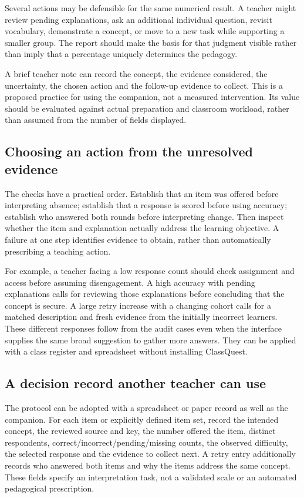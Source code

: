 Several actions may be defensible for the same numerical result. A teacher might review pending explanations, ask an additional individual question, revisit vocabulary, demonstrate a concept, or move to a new task while supporting a smaller group. The report should make the basis for that judgment visible rather than imply that a percentage uniquely determines the pedagogy.

A brief teacher note can record the concept, the evidence considered, the uncertainty, the chosen action and the follow-up evidence to collect. This is a proposed practice for using the companion, not a measured intervention. Its value should be evaluated against actual preparation and classroom workload, rather than assumed from the number of fields displayed.

\subsection{Choosing an action from the unresolved evidence}
The checks have a practical order. Establish that an item was offered before interpreting absence; establish that a response is scored before using accuracy; establish who answered both rounds before interpreting change. Then inspect whether the item and explanation actually address the learning objective. A failure at one step identifies evidence to obtain, rather than automatically prescribing a teaching action.

For example, a teacher facing a low response count should check assignment and access before assuming disengagement. A high accuracy with pending explanations calls for reviewing those explanations before concluding that the concept is secure. A large retry increase with a changing cohort calls for a matched description and fresh evidence from the initially incorrect learners. These different responses follow from the audit cases even when the interface supplies the same broad suggestion to gather more answers. They can be applied with a class register and spreadsheet without installing ClassQuest.

\subsection{A decision record another teacher can use}
The protocol can be adopted with a spreadsheet or paper record as well as the companion. For each item or explicitly defined item set, record the intended concept, the reviewed source and key, the number offered the item, distinct respondents, correct/incorrect/pending/missing counts, the observed difficulty, the selected response and the evidence to collect next. A retry entry additionally records who answered both items and why the items address the same concept. These fields specify an interpretation task, not a validated scale or an automated pedagogical prescription.

